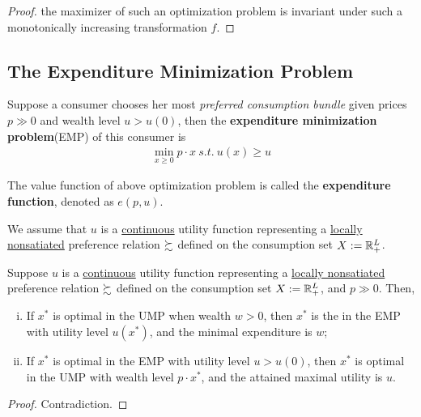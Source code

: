 \documentclass{report}
\begin{document}
 			\begin{proof}
 				the maximizer of such an optimization problem is invariant under such a monotonically increasing transformation $f$.
 			\end{proof}
 			
 		\subsection{The Expenditure Minimization Problem}
 			\begin{definition}
 				Suppose a consumer chooses her most \emph{preferred consumption bundle} given prices $p \gg 0$ and wealth level $u > u(0)$, then the \textbf{expenditure minimization problem}(EMP) of this consumer is
 				\begin{align}
 					\min_{x \geq 0} p \cdot x \ s.t.\ u(x) \geq u
 				\end{align}
 			\end{definition}
 			
 			\begin{definition}
 				The value function of above optimization problem is called the \textbf{expenditure function}, denoted as $e(p, u)$.
 			\end{definition}
 			
 			\begin{assumption}
 				We assume that $u$ is a \ul{continuous} utility function representing a \ul{locally nonsatiated} preference relation $\succsim$ defined on the consumption set $X := \mathbb{R}^L_+$.
 			\end{assumption}
 			
 			\begin{proposition}
 				Suppose $u$ is a \ul{continuous} utility function representing a \ul{locally nonsatiated} preference relation $\succsim$ defined on the consumption set $X := \mathbb{R}^L_+$, and $p \gg 0$. Then,
 				\begin{enumerate}[(i)]
 					\item If $x^*$ is optimal in the UMP when wealth $w > 0$, then $x^*$ is the in the EMP with utility level $u(x^*)$, and the minimal expenditure is $w$;
 					\item If $x^*$ is optimal in the EMP with utility level $u > u(0)$, then $x^*$ is optimal in the UMP with wealth level $p \cdot x^*$, and the attained maximal utility is $u$.
 				\end{enumerate}
 			\end{proposition}
 			\begin{proof}
 				Contradiction.
 			\end{proof}
 			
\end{document}
